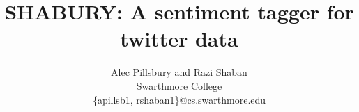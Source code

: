 \documentclass[11pt,letterpaper]{article}
\begin{document}
\newcommand{\AlgName}{SHABURY}

\date{}

\title{SHABURY: A sentiment tagger for twitter data}

\author{
    Alec Pillsbury and Razi Shaban\\
    Swarthmore College\\
    \{apillsb1, rshaban1\}@cs.swarthmore.edu
}

\maketitle









\balance
\end{document}
